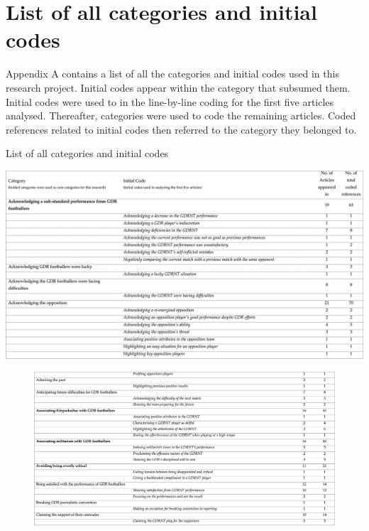 \newpage
\appendix
\chapter{List of all categories and initial codes}

Appendix A contains a list of all the categories and initial codes used in this research project. Initial codes appear within the category that subsumed them. Initial codes were used to in the line-by-line coding for the first five articles analysed. Thereafter, categories were used to code the remaining articles. Coded references related to initial codes then referred to the category they belonged to.

\begin{landscape}
\begin{table}[h]
\centering
\bigskip\bigskip\bigskip
\caption{List of all categories and initial codes}
\includegraphics[width=\linewidth]{mres/images/appendix/a1.png}
\end{table}
\end{landscape}

\begin{landscape}
\begin{figure}[h]
\centering
\bigskip\bigskip\bigskip\bigskip\bigskip
\includegraphics[width=\linewidth]{mres/images/appendix/a2.png}
\end{figure}
\end{landscape}

